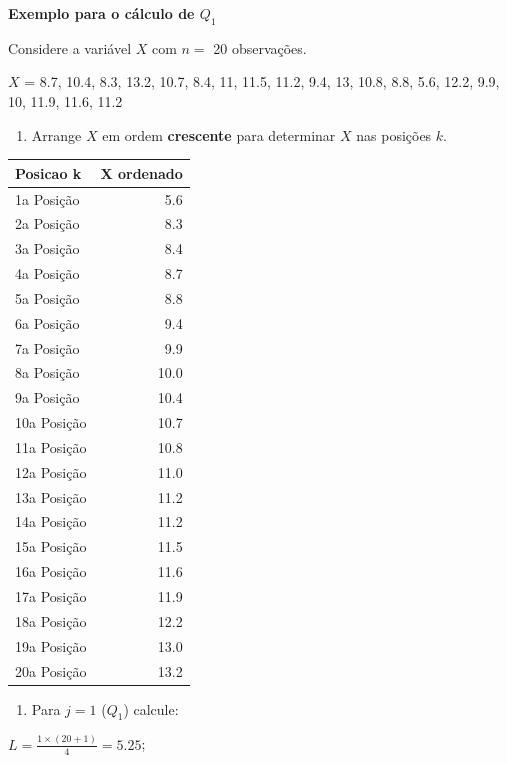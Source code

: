 \documentclass[
]{book}
\providecommand{\tightlist}{%
  \setlength{\itemsep}{0pt}\setlength{\parskip}{0pt}}
\begin{document}
\textbf{Exemplo para o cálculo de \(Q_1\)}

Considere a variável \(X\) com \(n =\) 20 observações.

\(X\) = 8.7, 10.4, 8.3, 13.2, 10.7, 8.4, 11, 11.5, 11.2, 9.4, 13, 10.8, 8.8, 5.6, 12.2, 9.9, 10, 11.9, 11.6, 11.2

\begin{enumerate}
\def\labelenumi{\arabic{enumi}.}
\tightlist
\item
  Arrange \(X\) em ordem \textbf{crescente} para determinar \(X\) nas posições \(k\).
\end{enumerate}

\begin{tabular}{l|r}
\hline
Posicao k & X ordenado\\
\hline
1a Posição & 5.6\\
\hline
2a Posição & 8.3\\
\hline
3a Posição & 8.4\\
\hline
4a Posição & 8.7\\
\hline
5a Posição & 8.8\\
\hline
6a Posição & 9.4\\
\hline
7a Posição & 9.9\\
\hline
8a Posição & 10.0\\
\hline
9a Posição & 10.4\\
\hline
10a Posição & 10.7\\
\hline
11a Posição & 10.8\\
\hline
12a Posição & 11.0\\
\hline
13a Posição & 11.2\\
\hline
14a Posição & 11.2\\
\hline
15a Posição & 11.5\\
\hline
16a Posição & 11.6\\
\hline
17a Posição & 11.9\\
\hline
18a Posição & 12.2\\
\hline
19a Posição & 13.0\\
\hline
20a Posição & 13.2\\
\hline
\end{tabular}

\begin{enumerate}
\def\labelenumi{\arabic{enumi}.}
\setcounter{enumi}{1}
\tightlist
\item
  Para \(j = 1\) (\(Q_1\)) calcule:
\end{enumerate}

\(L = \frac{1 \times (20+1)}{4} = 5.25\);
\end{document}
